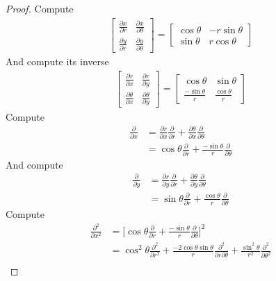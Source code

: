 \documentclass{report}
\begin{document}
\begin{proof}
Compute 
\begin{align*}
\begin{bmatrix}
  \frac{\partial x}{\partial r} & \frac{\partial x}{\partial  \theta} \\
  \frac{\partial y}{\partial r} & \frac{\partial y}{\partial  \theta}
\end{bmatrix} = \begin{bmatrix}
  \cos \theta & -r \sin \theta \\
  \sin \theta & r \cos \theta
\end{bmatrix}
\end{align*}
And compute its inverse
\begin{align*}
\begin{bmatrix}
  \frac{\partial r}{\partial x} & \frac{\partial r}{\partial y} \\
  \frac{\partial \theta}{\partial x} & \frac{\partial  \theta}{\partial y}
\end{bmatrix} = \begin{bmatrix}
  \cos \theta & \sin \theta   \\
  \frac{- \sin \theta}{r} & \frac{\cos \theta}{r}
\end{bmatrix}
\end{align*}
Compute 
\begin{align*}
\frac{\partial }{\partial x}&= \frac{\partial r}{\partial x} \frac{\partial }{\partial r}+ \frac{\partial \theta}{\partial x} \frac{\partial }{\partial \theta} \\
&= \cos \theta \frac{\partial }{\partial r}+ \frac{- \sin \theta}{r} \frac{\partial }{\partial \theta}
\end{align*}
And compute 
\begin{align*}
\frac{\partial }{\partial y}&= \frac{\partial r}{\partial y} \frac{\partial }{\partial r}+ \frac{\partial \theta}{\partial y} \frac{\partial }{\partial \theta} \\
&= \sin \theta \frac{\partial }{\partial r}+ \frac{\cos \theta}{r} \frac{\partial }{\partial \theta}
\end{align*}
Compute 
\begin{align*}
\frac{\partial^2 }{\partial x^2}&= \Big[\cos \theta \frac{\partial }{\partial r}+ \frac{- \sin \theta}{r} \frac{\partial }{\partial \theta}\Big]^2 \\
&= \cos^2 \theta \frac{\partial^2}{\partial r^2}+ \frac{-2\cos \theta \sin \theta}{r}  \frac{\partial^2}{\partial  r \partial  \theta} + \frac{\sin^2 \theta}{r^2} \frac{\partial ^2}{\partial \theta^2} \\

\end{align*}
\end{proof}
\end{document}
